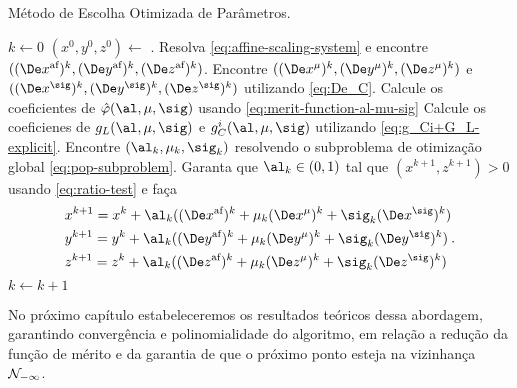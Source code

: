 \begin{algorithm}
\onehalfspacing
\caption{Método de Escolha Otimizada de Parâmetros.}
\label{alg:optimized-choice-of-parameters} \begin{algorithmic}[1]
\State $k \gets 0$
\State $(x^0,y^0,z^0) \gets$ .
	\Repeat
		\State Resolva   \eqref{eq:affine-scaling-system} e encontre
		$((\dex)^{k},(\dey)^{k},(\dez)^{k})$.
		\State 	Encontre $((\Dex^\mu)^{k},(\Dey^\mu)^{k},(\Dez^\mu)^{k})$ e
		$((\Dex^\sig)^{k},(\Dey^\sig)^{k},(\Dez^\sig)^{k})$ utilizando
		\eqref{eq:De_C}.
		\State Calcule os coeficientes de  $\nextphi(\al,\mu,\sig)$ usando
		\eqref{eq:merit-function-al-mu-sig} 
		\State Calcule os coeficienes de $g_{L}(\al,\mu,\sig)$ e $g^{i}_{C}(\al,\mu,\sig)$ utilizando \eqref{eq:g_Ci+G_L-explicit}.
		\State Encontre $(\alk,\muk,\sigk)$ resolvendo o subproblema de
		otimização global 
		\eqref{eq:pop-subproblem}.
		\State Garanta que $\alk \in(0,1)$ tal que $(x^{k+1},z^{k+1})>0$ usando \eqref{eq:ratio-test} e faça
		\[
		\begin{aligned}	
		& x^{k+1} = x^{k} + \alk ((\dex)^{k} + \muk (\Dex^\mu)^{k} +
		\sigk(\Dex^\sig)^{k} )
		\\
		& y^{k+1} = y^{k} + \alk ((\dey)^{k} + \muk (\Dey^\mu)^{k} +
		\sigk (\Dey^\sig)^{k} )
		\\
		& z^{k+1} = z^{k} + \alk ((\dez)^{k} + \muk (\Dez^\mu)^{k} +
		\sigk (\Dez^\sig)^{k} ) \end{aligned}. 
		\]		
		\State $k\gets k+1$
\EndProcedure
\end{algorithmic}
\end{algorithm}
  
 No próximo capítulo estabeleceremos os resultados teóricos dessa abordagem, garantindo convergência e polinomialidade do algoritmo, em relação a redução da função de mérito e da garantia de que o próximo ponto esteja na vizinhança $\mathcal{N}_{-\infty}$.
 
